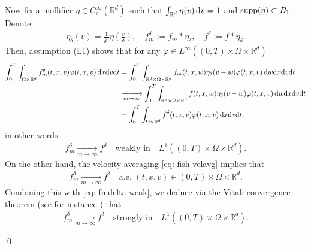 \documentclass[10pt, reqno]{amsart}
\theoremstyle{plain}
\theoremstyle{definition}
\theoremstyle{remark}
\renewenvironment{proof}[1][\proofname]{\noindent{\scshape #1.\quad}}{\qed}
\numberwithin{equation}{section}
\newcommand{\R}{\mathbb{R}}
\newcommand{\dx}{\textnormal{d}x}
\newcommand{\dv}{\textnormal{d}v}
\newcommand{\dw}{\textnormal{d}w}
\newcommand{\dt}{\textnormal{d}t}
\newcommand{\intr}{\int_{\R^d}}
\begin{document}
\begin{proof}[Proof of Lemma \ref{lem: key compactness}]
    Now fix a mollifier $\eta\in C_c^\infty(\R^d)$ such that $\intr \eta(v)\,\dv = 1$ and $\textnormal{supp}(\eta)\subset B_1$. Denote
    \begin{align*}
        \eta_\delta(v) = \frac{1}{\delta^d} \eta\left(\frac{v}{\delta}\right), \quad f_m^\delta:= f_m * \eta_\delta, \quad f^\delta := f * \eta_\delta. 
    \end{align*}
    Then, assumption (L1) shows that for any $\varphi \in L^\infty((0,T)\times\Omega\times\R^d)$
    \begin{align*}
        \int_0^T \int_{\Omega\times\R^d} f_m^\delta(t,x,v) \varphi(t,x,v) \,\dx\dv\dt &= \int_0^T \int_{\R^d \times \Omega\times\R^d  } f_m(t,x,w) \eta_\delta(v-w) \varphi(t,x,v) \,\dw\dx\dv\dt \\
        &\xrightarrow[m\to\infty]{} \int_0^T \int_{\R^d \times \Omega\times\R^d } f(t,x,w) \eta_\delta(v-w) \varphi(t,x,v) \,\dw\dx\dv\dt \\
        &= \int_0^T \int_{\Omega\times\R^d} f^\delta(t,x,v) \varphi(t,x,v) \,\dx\dv\dt ,
    \end{align*}
    in other words
    \begin{align}\label{eq: fmdelta weak}
        f_m^\delta \xrightarrow[m\to\infty]{} f^\delta \quad \text{weakly in}\quad L^1((0,T)\times\Omega\times\R^d).
    \end{align}
    On the other hand, the velocity averaging \eqref{eq: fish velavg} implies that
    \begin{align*}
        f_m^\delta \xrightarrow[m\to\infty]{} f^\delta \quad \text{a.e. }(t,x,v)\in (0,T)\times\Omega\times\R^d.
    \end{align*}
    Combining this with \eqref{eq: fmdelta weak}, we deduce via the Vitali  convergence theorem (see for instance \cite[IV.8]{DunfordSchwartz}) that
    \begin{align}\label{eq: fmdelta L1}
        f_m^\delta \xrightarrow[m\to\infty]{} f^\delta \quad \text{strongly in} \quad L^1((0,T)\times\Omega\times\R^d).
    \end{align}
    

\end{proof}
\end{document}

